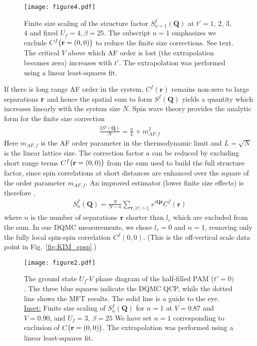 \documentclass[pra,letterpaper,10pt,twocolumn]{revtex4}
\begin{document}
\begin{figure}[!h]
\texttt{[image: figure4.pdf]} 
\caption{
Finite size scaling of the structure factor $S^f_{n=1}(\textbf{Q})$ at
$t'=1$, $2$, $3$, $4$ and fixed $U_f=4, \beta=25$. 
The subscript $n=1$ emphasizes we 
exclude $C^f\big({\bf r}=(0,0)\big)$ to reduce the
finite size corrections.  See text.  
The critical $V$ above which AF order is lost (the extrapolation becomes
zero) increases with $t'$.
The extrapolation was performed
using a linear least-squares fit.
\label{fig:KIM_scaling}
}
\end{figure}

If there is long range AF order in the system, $C^f(\textbf{r})$ remains
non-zero to large separations ${\bf r}$ and hence the spatial sum to
form $S^f(\textbf{Q})$ yields a quantity which increases linearly with
the system size $N$.  Spin wave theory\cite{Huse88} provides the
analytic form for the finite size correction
\begin{align}
   \frac{3S^f(\textbf{Q})}{N} = \frac{a}{L}+m^2_{AF,f}
\label{eq:correction}
\end{align}
Here $m_{AF,f}$ is the AF order parameter in the thermodynamic limit and
$L=\sqrt{N}$ is the linear lattice size.  The
correction factor $a$ can be reduced by excluding short range
terms $C^f\big({\bf r}=(0,0)\big)$ from the sum used to build the full 
structure factor, since spin correlations at short distances are enhanced over the square of the order parameter $m_{AF,f}$.  An improved estimator (lower
finite size effects) is therefore \cite{Varney09},
\begin{align}
  S^f_n(\textbf{Q})=\frac{N}{N-n}\sum_{\textbf{r}, |r|>l_c}e^{i\textbf{Q}\textbf{r}}C^f(\textbf{r})
\label{eq:structure_exclusion}
\end{align}
where $n$ is the number of separations ${\bf r}$ shorter than $l_c$
which are excluded from the sum.  In our DQMC measurements, we chose
$l_c=0$ and $n=1$, removing only the fully local spin-spin correlation
$C^f(0,0)$.  (This is the off-vertical scale data point in 
Fig.~\ref{fig:KIM_spsp}.)

\begin{figure}[!h]
\texttt{[image: figure2.pdf]} 
\caption{
The ground state $U_f$-$V$ phase diagram of the half-filled PAM
($t'=0)$.  The
three blue squares indicate the DQMC QCP, while the dotted
line shows the MFT results. The solid line is a guide to the eye.
\underline{Inset:} Finite size scaling of $S^f_n(\textbf{Q})$
for $n=1$ at
$V=0.87$ and $V=0.90$, and $U_f=3$, $\beta=25$
We have set $n=1$ corresponding to 
exclusion of  $C\big({\bf r}=(0,0)\big)$. 
The extrapolation was performed using a linear least-squares fit. 
\label{fig:PAM_phase_diagram}
}
\end{figure}
\end{document}
